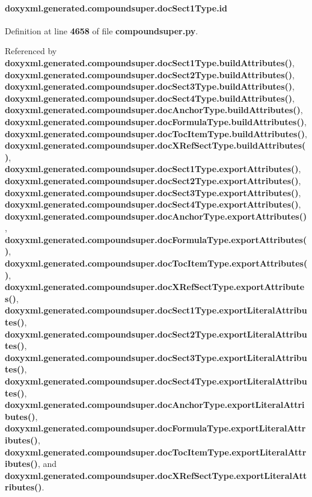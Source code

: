 \paragraph[{id}]{\setlength{\rightskip}{0pt plus 5cm}doxyxml.\+generated.\+compoundsuper.\+doc\+Sect1\+Type.\+id}\label{classdoxyxml_1_1generated_1_1compoundsuper_1_1docSect1Type_a862b64fd16e21886ef5003cbd3b7e669}


Definition at line {\bf 4658} of file {\bf compoundsuper.\+py}.



Referenced by {\bf doxyxml.\+generated.\+compoundsuper.\+doc\+Sect1\+Type.\+build\+Attributes()}, {\bf doxyxml.\+generated.\+compoundsuper.\+doc\+Sect2\+Type.\+build\+Attributes()}, {\bf doxyxml.\+generated.\+compoundsuper.\+doc\+Sect3\+Type.\+build\+Attributes()}, {\bf doxyxml.\+generated.\+compoundsuper.\+doc\+Sect4\+Type.\+build\+Attributes()}, {\bf doxyxml.\+generated.\+compoundsuper.\+doc\+Anchor\+Type.\+build\+Attributes()}, {\bf doxyxml.\+generated.\+compoundsuper.\+doc\+Formula\+Type.\+build\+Attributes()}, {\bf doxyxml.\+generated.\+compoundsuper.\+doc\+Toc\+Item\+Type.\+build\+Attributes()}, {\bf doxyxml.\+generated.\+compoundsuper.\+doc\+X\+Ref\+Sect\+Type.\+build\+Attributes()}, {\bf doxyxml.\+generated.\+compoundsuper.\+doc\+Sect1\+Type.\+export\+Attributes()}, {\bf doxyxml.\+generated.\+compoundsuper.\+doc\+Sect2\+Type.\+export\+Attributes()}, {\bf doxyxml.\+generated.\+compoundsuper.\+doc\+Sect3\+Type.\+export\+Attributes()}, {\bf doxyxml.\+generated.\+compoundsuper.\+doc\+Sect4\+Type.\+export\+Attributes()}, {\bf doxyxml.\+generated.\+compoundsuper.\+doc\+Anchor\+Type.\+export\+Attributes()}, {\bf doxyxml.\+generated.\+compoundsuper.\+doc\+Formula\+Type.\+export\+Attributes()}, {\bf doxyxml.\+generated.\+compoundsuper.\+doc\+Toc\+Item\+Type.\+export\+Attributes()}, {\bf doxyxml.\+generated.\+compoundsuper.\+doc\+X\+Ref\+Sect\+Type.\+export\+Attributes()}, {\bf doxyxml.\+generated.\+compoundsuper.\+doc\+Sect1\+Type.\+export\+Literal\+Attributes()}, {\bf doxyxml.\+generated.\+compoundsuper.\+doc\+Sect2\+Type.\+export\+Literal\+Attributes()}, {\bf doxyxml.\+generated.\+compoundsuper.\+doc\+Sect3\+Type.\+export\+Literal\+Attributes()}, {\bf doxyxml.\+generated.\+compoundsuper.\+doc\+Sect4\+Type.\+export\+Literal\+Attributes()}, {\bf doxyxml.\+generated.\+compoundsuper.\+doc\+Anchor\+Type.\+export\+Literal\+Attributes()}, {\bf doxyxml.\+generated.\+compoundsuper.\+doc\+Formula\+Type.\+export\+Literal\+Attributes()}, {\bf doxyxml.\+generated.\+compoundsuper.\+doc\+Toc\+Item\+Type.\+export\+Literal\+Attributes()}, and {\bf doxyxml.\+generated.\+compoundsuper.\+doc\+X\+Ref\+Sect\+Type.\+export\+Literal\+Attributes()}.

